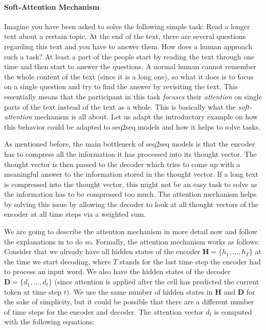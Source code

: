 \paragraph{Soft-Attention Mechanism}
\label{fundamentals:soft_attention}
Imagine you have been asked to solve the following simple task: Read a longer text about a certain topic. At the end of the text, there are several questions regarding this text and you have to answer them. How does a human approach such a task? At least a part of the people start by reading the text through one time and then start to answer the questions. A normal human cannot remember the whole content of the text (since it is a long one), so what it does is to focus on a single question and try to find the answer by revisiting the text. This essentially means that the participant in this task \emph{focuses} their \emph{attention} on single parts of the text instead of the text as a whole. This is basically what the \emph{soft-attention} \cite{Bahdanau:2014} mechanism is all about. Let us adapt the introductory example on how this behavior could be adapted to seq2seq models and how it helps to solve tasks.

As mentioned before, the main bottleneck of seq2seq models is that the encoder has to compress all the information it has processed into its thought vector. The thought vector is then passed to the decoder which tries to come up with a meaningful answer to the information stored in the thought vector. If a long text is compressed into the thought vector, this might not be an easy task to solve as the information has to be compressed too much. The attention mechanism helps by solving this issue by allowing the decoder to look at all thought vectors of the encoder at all time steps via a weighted sum. 

We are going to describe the attention mechanism in more detail now and follow the explanations in \cite{Vinyals:2015:Foreign} to do so. Formally, the attention mechanism works as follows: Consider that we already have all hidden states of the encoder $\mathbf{H} = \{h_1,\dots,h_T\}$ at the time we start decoding, where $T$ stands for the last time step the encoder had to process an input word. We also have the hidden states of the decoder $\mathbf{D} = \{d_1,\dots,d_t\}$ (since attention is applied after the cell has predicted the current token at time step $t$). We use the same number of hidden states in $\mathbf{H}$ and $\mathbf{D}$ for the sake of simplicity, but it could be possible that there are a different number of time steps for the encoder and decoder. The attention vector $d_t$ is computed with the following equations:

